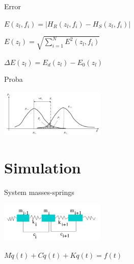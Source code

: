 \documentclass{beamer}
\begin{document}
\begin{frame}{Error}


\begin{center}
$E(z_l,f_i) = | H_R(z_l,f_i) - H_S(z_l,f_i) |$

\vspace{5mm}

$E(z_l) = \sqrt{  \sum\limits_{i=1}^N  E^2(z_l,f_i) }$

\vspace{5mm}

$\Delta E(z_l) = E_d(z_l) - E_0(z_l)$

\end{center}

\end{frame}

\begin{frame}{Proba}
\begin{center}
\includegraphics[width=5cm]{images/gaussiennes.png}
\end{center}
\end{frame}


\section{Simulation}

\begin{frame}{System masses-springs}
\begin{center}
\includegraphics[width=5cm]{images/ressorts.png}

$M \ddot{q}(t) + C \dot{q}(t) + K q(t) = f(t)$
\end{center}




\end{frame}
\end{document}
